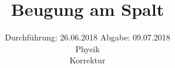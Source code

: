 

\subject{406}
\title{Beugung am Spalt}
\date{%
  Durchführung: 26.06.2018
  \hspace{3em}
  Abgabe: 09.07.2018 \\
  Physik \\
  Korrektur
}



\maketitle
\thispagestyle{empty}
\tableofcontents
\newpage






\printbibliography{}


